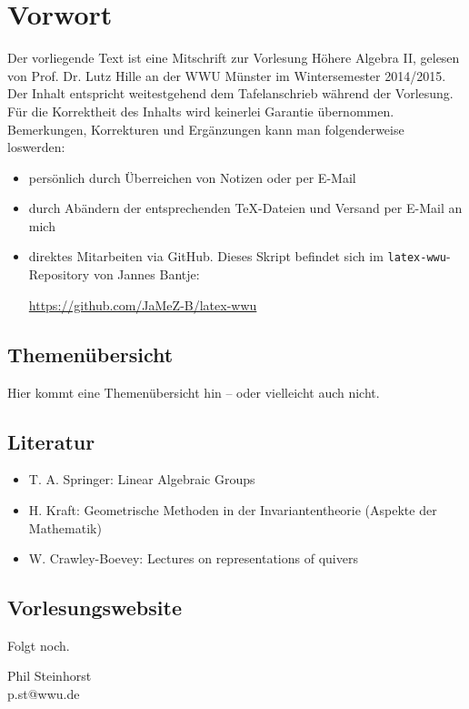 \section*{Vorwort}
\label{sec:preface}
	Der vorliegende Text ist eine Mitschrift zur Vorlesung Höhere Algebra II, gelesen von Prof. Dr. Lutz Hille an der WWU Münster im Wintersemester 2014/2015. Der Inhalt entspricht weitestgehend dem Tafelanschrieb während der Vorlesung. Für die Korrektheit des Inhalts wird keinerlei Garantie übernommen. Bemerkungen, Korrekturen und Ergänzungen kann man folgenderweise loswerden:
	\begin{itemize}
		\item persönlich durch Überreichen von Notizen oder per E-Mail
		\item durch Abändern der entsprechenden TeX-Dateien und Versand per E-Mail an mich
		\item direktes Mitarbeiten via GitHub. Dieses Skript befindet sich im \texttt{latex-wwu}-Repository von Jannes Bantje:
		\begin{center}
			\url{https://github.com/JaMeZ-B/latex-wwu}
		\end{center}
	\end{itemize}

\subsection*{Themenübersicht}
\label{sub:content}
	Hier kommt eine Themenübersicht hin -- oder vielleicht auch nicht.

\subsection*{Literatur}
\label{sub:lit}
	
\begin{itemize}
	\item T. A. Springer: Linear Algebraic Groups 
	\item H. Kraft: Geometrische Methoden in der Invariantentheorie (Aspekte der Mathematik)
	\item W. Crawley-Boevey: Lectures on representations of quivers
\end{itemize}

\subsection*{Vorlesungswebsite}
\label{sub:link}
	Folgt noch.



\vfill
\begin{flushright}
	Phil Steinhorst \\
	p.st@wwu.de
\end{flushright}
\newpage